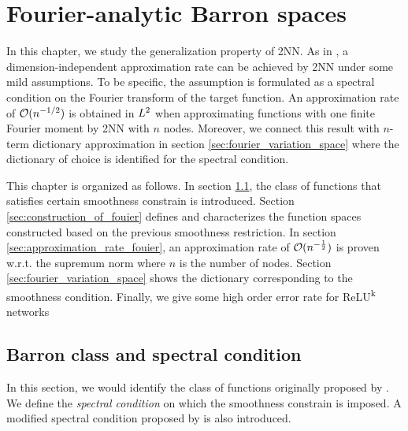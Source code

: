 \chapter{Fourier-analytic Barron spaces}
\label{ch:fourier}

In this chapter, we study the generalization property of 2NN. As in
\cite{barronUniversalApproximationBounds1993}, a dimension-independent
approximation rate can be achieved by 2NN under some mild assumptions. To be
specific, the assumption is formulated as a spectral condition on the Fourier
transform of the target function. An approximation rate of $\mathcal{O}(n^{-1/2})$ is
obtained in $L^{2}$ when approximating functions with one finite Fourier moment
by 2NN with $n$ nodes. Moreover, we connect this result with $n$-term dictionary
approximation in section \ref{sec:fourier_variation_space} where the dictionary
of choice is identified for the spectral condition.


This chapter is organized as follows. In section \ref{sec:spectral_condition},
the class of functions that satisfies certain smoothness constrain is
introduced. Section \ref{sec:construction_of_fouier} defines and characterizes
the function spaces constructed based on the previous smoothness restriction. In
section \ref{sec:approximation_rate_fouier}, an approximation rate of
$\mathcal{O}(n^{-\frac{1}{2}})$ is proven w.r.t. the supremum norm where $n$ is the
number of nodes. Section \ref{sec:fourier_variation_space} shows the dictionary
corresponding to the smoothness condition. Finally, we give some high order
error rate for ReLU\textsuperscript{k} networks

\section{Barron class and spectral condition}
\label{sec:spectral_condition}

In this section, we would identify the class of functions originally proposed by
\cite{barronUniversalApproximationBounds1993}. We define the \textit{spectral
condition} on which the smoothness constrain is imposed. A modified spectral
condition proposed by \cite{siegelCharacterizationVariationSpaces2022} is also
introduced.

